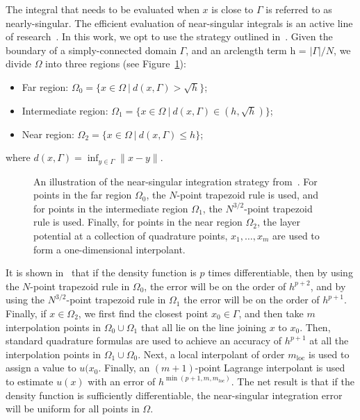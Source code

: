 \documentclass[final]{siamltex}
\begin{document}
The integral that needs to be evaluated when $x$ is close to $\Gamma$ is
referred to as nearly-singular.  The efficient evaluation of
near-singular integrals is an active line of
research~\cite{hel2013,hel:oja2008,klo:bar:gre:one2012}.  In this work,
we opt to use the strategy outlined in~\cite{bir:yin:zor2006}.  Given
the boundary of a simply-connected domain $\Gamma$, and an arclength
term h = $|\Gamma|/N$, we divide $\Omega$ into three regions (see
Figure~\ref{f:nearsing}):
\begin{itemize}
  \item Far region: $\Omega_{0} = \{x \in \Omega \:|\: d(x,\Gamma) >
  \sqrt{h}\}$;

  \item Intermediate region: $\Omega_{1} = \{x \in \Omega \:|\:
  d(x,\Gamma) \in (h,\sqrt{h})\}$;

  \item Near region: $\Omega_{2}= \{x \in \Omega \:|\: d(x,\Gamma) \leq
  h\}$;
\end{itemize}
where $d(x,\Gamma) = \displaystyle\inf_{y \in \Gamma} \|x - y\|.$ 
\begin{figure}[htps]
\centering

\caption{\label{f:nearsing} An illustration of the near-singular
integration strategy from~\cite{bir:yin:zor2006}.  For points in the
far region $\Omega_{0}$, the $N$-point trapezoid rule is used, and for
points in the intermediate region $\Omega_{1}$, the $N^{3/2}$-point
trapezoid rule is used.  Finally, for points in the near region
$\Omega_{2}$, the layer potential at a collection of quadrature points,
$x_{1},\ldots,x_{m}$ are used to form a one-dimensional interpolant.}
\end{figure}

It is shown in~\cite{bir:yin:zor2006} that if the density function is
$p$ times differentiable, then by using the $N$-point trapezoid rule in
$\Omega_{0}$, the error will be on the order of $h^{p+2}$, and by using
the $N^{3/2}$-point trapezoid rule in $\Omega_{1}$ the error will be on
the order of $h^{p+1}$.  Finally, if $x \in \Omega_{2}$, we first find
the closest point $x_{0} \in \Gamma$, and then take $m$ interpolation
points in $\Omega_{0} \cup \Omega_{1}$ that all lie on the line joining
$x$ to $x_{0}$.  Then, standard quadrature formulas are used to achieve
an accuracy of $h^{p+1}$ at all the interpolation points in $\Omega_{1}
\cup \Omega_{0}$.  Next, a local interpolant of order $m_{\mathrm{loc}}$
is used to assign a value to $u(x_{0}$.  Finally, an $(m+1)$-point
Lagrange interpolant is used to estimate $u(x)$ with an error of
$h^{\min(p+1,m,m_{loc})}$.  The net result is that if the density
function is sufficiently differentiable, the near-singular integration
error will be uniform for all points in $\Omega$.\\
\end{document}
